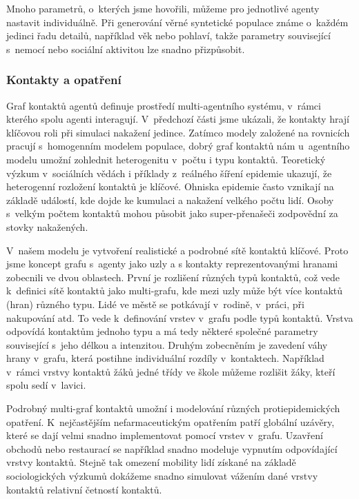 Mnoho parametrů, o~kterých jsme hovořili, můžeme pro jednotlivé agenty nastavit individuálně. Při generování věrné syntetické populace známe o~každém jedinci řadu detailů, například věk nebo pohlaví, takže parametry související s~nemocí nebo sociální aktivitou lze snadno přizpůsobit. 




\subsubsection*{Kontakty a opatření}

Graf kontaktů agentů definuje prostředí multi-agentního systému, v~rámci kterého spolu agenti interagují. V~předchozí části jsme ukázali, že kontakty hrají klíčovou roli při simulaci nakažení jedince. Zatímco modely založené na rovnicích pracují s~homogenním modelem populace, dobrý graf kontaktů nám u~agentního modelu umožní zohlednit heterogenitu v~počtu i typu kontaktů. Teoretický výzkum v~sociálních vědách i příklady z~reálného šíření epidemie ukazují, že heterogenní rozložení kontaktů je klíčové. Ohniska epidemie často vznikají na základě  událostí, kde dojde ke kumulaci a nakažení velkého počtu lidí. Osoby s~velkým počtem kontaktů mohou působit jako super-přenašeči zodpovědní za stovky nakažených.  

V~našem modelu je vytvoření realistické a podrobné sítě kontaktů klíčové. Proto jsme koncept grafu s~agenty jako uzly a s kontakty reprezentovanými hranami zobecnili ve dvou oblastech. První je rozlišení různých typů kontaktů, což vede k~definici sítě kontaktů jako multi-grafu, kde mezi uzly může být více kontaktů (hran) různého typu. Lidé ve městě se potkávají v~rodině, v~práci, při nakupování atd. To vede k~definování vrstev v~grafu podle typů kontaktů. Vrstva odpovídá kontaktům jednoho typu a má tedy některé společné parametry související s~jeho délkou a intenzitou. Druhým zobecněním je zavedení váhy hrany v~grafu, která postihne individuální rozdíly v~kontaktech. Například v~rámci vrstvy kontaktů žáků jedné třídy ve škole můžeme rozlišit žáky, kteří spolu sedí v~lavici. 

Podrobný multi-graf kontaktů umožní i modelování různých protiepidemických opatření. K~nejčastějším nefarmaceutickým opatřením patří globální uzávěry, které se dají velmi snadno implementovat pomocí vrstev v~grafu. Uzavření obchodů nebo restaurací se například snadno modeluje vypnutím odpovídající vrstvy kontaktů. Stejně tak omezení mobility lidí získané na základě sociologických výzkumů dokážeme snadno simulovat vážením dané vrstvy kontaktů relativní četností kontaktů.

